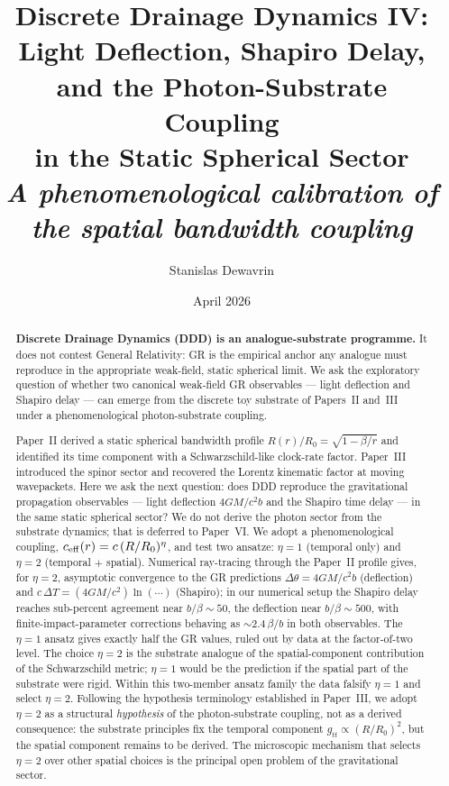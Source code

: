 \documentclass[11pt,a4paper]{article}
\title{\textbf{Discrete Drainage Dynamics IV:\\
Light Deflection, Shapiro Delay, and the Photon-Substrate Coupling\\
in the Static Spherical Sector\\[0.4em]
\Large\itshape A phenomenological calibration of the spatial bandwidth coupling}}
\author[1]{Stanislas Dewavrin}
\affil[1]{Independent researcher \\ \texttt{dewavrin.iphone@gmail.com}}
\date{April 2026}
\begin{document}
\maketitle

\begin{abstract}
\noindent
\textbf{Discrete Drainage Dynamics (DDD) is an analogue-substrate
programme.} It does not contest General Relativity: GR is the
empirical anchor any analogue must reproduce in the
appropriate weak-field, static spherical limit. We ask the
exploratory question of whether two canonical weak-field GR
observables --- light deflection and Shapiro delay --- can
emerge from the discrete toy substrate of Papers~II and~III
under a phenomenological photon-substrate coupling.

Paper~II derived a static spherical bandwidth profile
$R(r)/R_0 = \sqrt{1 - \beta/r}$ and identified its time
component with a Schwarzschild-like clock-rate factor. Paper~III
introduced the spinor sector and recovered the Lorentz kinematic
factor at moving wavepackets. Here we ask the next question: does
DDD reproduce the gravitational propagation observables --- light
deflection $4GM/c^2 b$ and the Shapiro time delay --- in the same
static spherical sector? We do not derive the photon sector from
the substrate dynamics; that is deferred to Paper~VI. We adopt a
phenomenological coupling, $c_{\rm eff}(r) = c\,(R/R_0)^\eta$,
and test two ansatze: $\eta = 1$ (temporal only) and
$\eta = 2$ (temporal $+$ spatial). Numerical ray-tracing through
the Paper~II profile gives, for $\eta = 2$, asymptotic
convergence to the GR predictions $\Delta\theta = 4GM/c^2 b$
(deflection) and $c\,\Delta T = (4GM/c^2)\ln(\cdots)$ (Shapiro);
in our numerical setup the Shapiro delay reaches sub-percent
agreement near $b/\beta \sim 50$, the deflection near
$b/\beta \sim 500$, with finite-impact-parameter corrections
behaving as $\sim 2.4\,\beta/b$ in both observables. The
$\eta = 1$ ansatz gives exactly half the GR values, ruled out
by data at the factor-of-two level. The
choice $\eta = 2$ is the substrate analogue of the
spatial-component contribution of the Schwarzschild metric;
$\eta = 1$ would be the prediction if the spatial part of the
substrate were rigid. Within this two-member ansatz family the
data falsify $\eta = 1$ and select $\eta = 2$. Following the
hypothesis terminology established in Paper~III, we adopt
$\eta = 2$ as a structural \emph{hypothesis} of the
photon-substrate coupling, not as a derived consequence: the
substrate principles fix the temporal component
$g_{tt} \propto (R/R_0)^2$, but the spatial component remains
to be derived. The microscopic mechanism that selects
$\eta = 2$ over other spatial choices is the principal open
problem of the gravitational sector.
\end{abstract}
\end{document}

